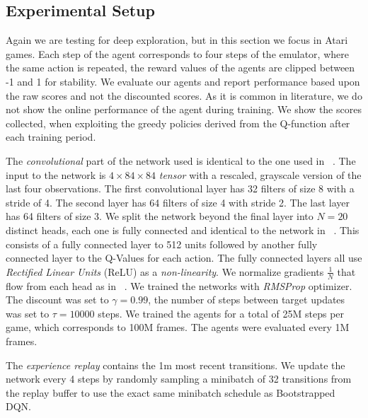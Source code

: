 \subsection{Experimental Setup}
Again we are testing for deep exploration, but in this section we focus in Atari games. Each step of the agent corresponds to four steps of the emulator, where the same action is repeated, the reward values of the agents are clipped between -1 and 1 for stability. We evaluate our agents and report performance based upon the raw scores and not the discounted scores. As it is common in literature, we do not show the online performance of the agent during training. We show the scores collected, when exploiting the greedy policies derived from the Q-function after each training period.\par
The \emph{convolutional} part of the network used is identical to the one used in ~\cite{DBLP:journals/corr/OsbandBPR16}. The input to the network is $4\times 84 \times 84$ \emph{tensor} with a rescaled, grayscale version of the last four observations. The first convolutional layer has 32 filters of size 8 with a stride of 4. The second layer has 64 filters of size 4 with stride 2. The last layer has 64 filters of size 3. We split the network beyond the final layer into $N = 20$ distinct heads, each one is fully connected and identical to the network in ~\cite{DBLP:journals/corr/OsbandBPR16}. This consists of a fully connected layer to 512 units followed by another fully connected layer to the Q-Values for each action. The fully connected layers all use \emph{Rectified Linear Units} (ReLU) as a \emph{non-linearity}. We normalize gradients $\frac{1}{N}$ that flow from each head as in ~\cite{DBLP:journals/corr/OsbandBPR16}.
We trained the networks with \emph{RMSProp} optimizer. The discount was set to $\gamma = 0.99$, the number of steps between target updates was set to $\tau= 10000$ steps. We trained the agents for a total of 25M steps per game, which corresponds to 100M frames. The agents were evaluated every 1M frames. \par
The \emph{experience replay} contains the 1m most recent transitions. We update the network every 4 steps by randomly sampling a minibatch of 32 transitions from the replay buffer to use the exact same minibatch schedule as Bootstrapped DQN. 